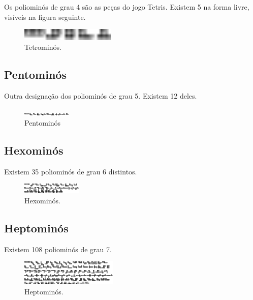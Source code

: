 \documentclass[11pt]{article}
\begin{document}
Os poliominós de grau 4 são as peças do jogo Tetris. Existem 5 na
forma livre, visíveis na figura seguinte.

\begin{figure}[H]
\centering
  \includegraphics[width=0.4\textwidth]{../images/poliominos-4-free.pdf}
\caption{Tetrominós.}
\end{figure}


\subsection{Pentominós}

Outra designação dos poliominós de grau 5. Existem 12 deles.

\begin{figure}[H]
\centering
  \includegraphics[width=\textwidth]{../images/poliominos-5-free.pdf}
\caption{Pentominós}
\end{figure}


\subsection{Hexominós}

Existem 35 poliominós de grau 6 distintos.

\begin{figure}[H]
\centering
  \includegraphics[width=\textwidth]{../images/poliominos-6-free.pdf}
\caption{Hexominós.}
\end{figure}


\subsection{Heptominós}

Existem 108 poliominós de grau 7.

\begin{figure}[H]
\centering
  \includegraphics[width=\textwidth]{../images/poliominos-7-free.pdf}
\caption{Heptominós.}
\end{figure}
\end{document}
